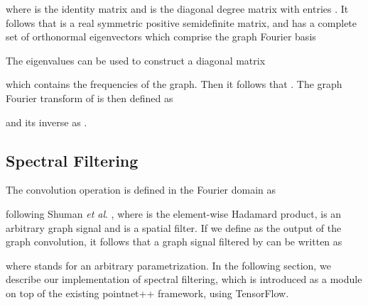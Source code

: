 \documentclass[runningheads]{llncs}
\newcommand{\etal}{\textit{et al}. }
\begin{document}
where  is the identity matrix and  is the diagonal degree matrix with entries .
It follows that  is a real symmetric positive semidefinite matrix, and has a complete set of orthonormal eigenvectors which comprise the graph Fourier basis 

The eigenvalues can be used to construct a diagonal matrix 

which contains the frequencies of the graph. Then it follows that . 
The graph Fourier transform of  is then defined as

and its inverse as 
.


\subsection{Spectral Filtering}

The convolution operation is defined in the Fourier domain as
 
following Shuman \etal \cite{shuman2013emerging}, where  is the element-wise Hadamard product,  is an arbitrary graph signal and  is a spatial filter. If we define  as the output of the graph convolution, it follows that a graph signal  filtered by  can be written as

where  stands for an arbitrary parametrization. In the following section, we describe our implementation of spectral filtering, which is introduced as a module on top of the existing pointnet++ \cite{qi2017pointnet} framework, using TensorFlow.
\end{document}
